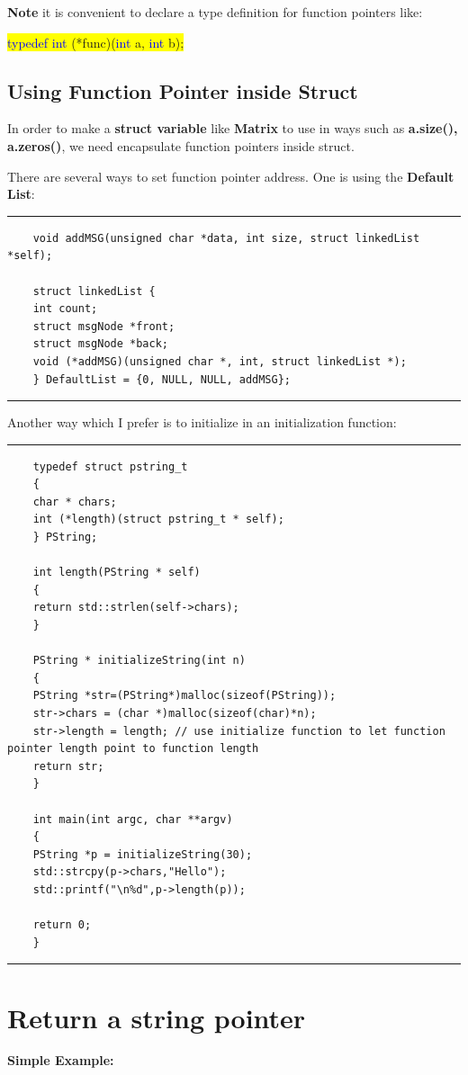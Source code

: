 	\textbf{Note} it is convenient to declare a type definition for function pointers like:
	
	\colorbox{yellow}{\textcolor{blue}{typedef int} (*func)(\textcolor{blue}{int} a, \textcolor{blue}{int} b);}
	
	\subsection{Using Function Pointer inside Struct}
	In order to make a \textbf{struct variable} like \textbf{Matrix} to use in ways such as \textbf{a.size(), a.zeros()}, we need encapsulate function pointers inside struct.
	
	There are several ways to set function pointer address. One is using the \textbf{Default List}:
	
	\noindent\vspace{1em}\hrule
	\begin{verbatim}
	void addMSG(unsigned char *data, int size, struct linkedList *self);
	
	struct linkedList {
	int count;
	struct msgNode *front;
	struct msgNode *back;
	void (*addMSG)(unsigned char *, int, struct linkedList *);
	} DefaultList = {0, NULL, NULL, addMSG};
	\end{verbatim}
	\noindent\hrule\vspace{1em}
	
	Another way which I prefer is to initialize in an initialization function:
	
	\noindent\vspace{1em}\hrule
	\begin{verbatim}
	typedef struct pstring_t
	{
	char * chars;
	int (*length)(struct pstring_t * self);
	} PString;
	
	int length(PString * self)
	{
	return std::strlen(self->chars);
	}
	
	PString * initializeString(int n)
	{
	PString *str=(PString*)malloc(sizeof(PString));
	str->chars = (char *)malloc(sizeof(char)*n);
	str->length = length; // use initialize function to let function pointer length point to function length
	return str;
	}
	
	int main(int argc, char **argv)
	{
	PString *p = initializeString(30);
	std::strcpy(p->chars,"Hello");
	std::printf("\n%d",p->length(p));
	
	return 0;
	}
	\end{verbatim}
	\noindent\vspace{1em}\hrule
	
	\section{Return a string pointer}
	\textbf{Simple Example:}\\
	
